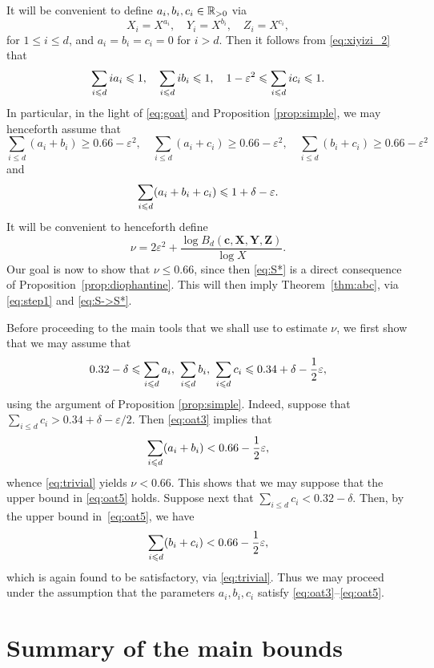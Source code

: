 It will be convenient to define  $a_i,b_i,c_i\in \mathbb{R}_{>0}$ via
$$
X_i=X^{a_i}, \quad  Y_i=X^{b_i}, \quad Z_i=X^{c_i},
$$
for $1\leq i\leq d$, and $a_i=b_i=c_i=0$ for $i>d$. Then it follows from
\eqref{eq:xiyizi_2} that
\begin{equation}\label{eq:oat1}
\sum_{i\leqslant d} ia_i \leqslant 1, \quad  \sum_{i\leqslant d} ib_i  \leqslant 1, \quad   1-\varepsilon^2\leqslant \sum_{i\leqslant d} ic_i \leqslant 1.
\end{equation}
In particular, in the light of \eqref{eq:goat} and
 Proposition \ref{prop:simple}, we
may henceforth assume that
\begin{equation}\label{eq:oat4}
\sum_{i\leq d} (a_i+b_i)\geq 0.66-\varepsilon^2,\quad \sum_{i\leq d} (a_i+c_i)\geq 0.66-\varepsilon^2,\quad
\sum_{i\leq d} (b_i+c_i) \geq  0.66-\varepsilon^2
\end{equation}
and
\begin{equation}\label{eq:oat3}
\sum_{i\leqslant d} (a_i+b_i+c_i) \leqslant 1+\delta-\varepsilon.
\end{equation}
It will be convenient to henceforth define
$$
\nu=2\varepsilon^2+\frac{\log B_d(\mathbf{c},\mathbf{X},\mathbf{Y},\mathbf{Z})}{\log X}.
$$
Our goal is now to show that $\nu\le 0.66$, since then
\eqref{eq:S*}
is a direct consequence of
Proposition~\ref{prop:diophantine}.
This will then imply
Theorem~\ref{thm:abc}, via \eqref{eq:step1} and \eqref{eq:S->S*}.


Before proceeding to the main tools that we shall use to estimate $\nu$, we first show that we may assume that  \begin{equation}\label{eq:oat5}
0.32 - \delta \leqslant \sum_{i\leqslant d} a_i ,~  \sum_{i\leqslant d} b_i  ,~ \sum_{i\leqslant d} c_i \leqslant 0.34 + \delta-
\frac{1}{2}\varepsilon,
\end{equation}
using the argument of Proposition \ref{prop:simple}. Indeed, suppose that
$\sum_{i\leq d} c_i> 0.34 + \delta-\varepsilon/2$. Then \eqref{eq:oat3} implies that
 $$
 \sum_{i\leqslant d} (a_i + b_i)<
 0.66-\frac{1}{2}\varepsilon,
 $$
 whence
  \eqref{eq:trivial} yields $\nu< 0.66$. This shows that we may suppose that the upper bound in \eqref{eq:oat5} holds.
  Suppose next that
  $\sum_{i\leq d} c_i< 0.32 - \delta$. Then, by the upper bound in~\eqref{eq:oat5}, we have
   $$
 \sum_{i\leqslant d} (b_i + c_i)< 0.66-\frac{1}{2}\varepsilon,
 $$
which is again found to be satisfactory, via \eqref{eq:trivial}. Thus we may proceed under the assumption that the parameters $a_i,b_i,c_i$ satisfy \eqref{eq:oat3}--\eqref{eq:oat5}.


\section{Summary of the main bounds}

